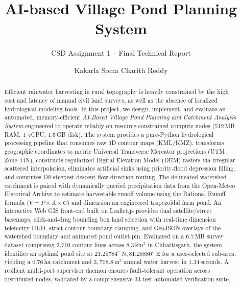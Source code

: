 \documentclass[manuscript,screen,review]{acmart}
\begin{document}
\title{AI-based Village Pond Planning System}
\subtitle{CSD Assignment 1 -- Final Technical Report}

\author{Kakarla Soma Charith Reddy}

\renewcommand{\shortauthors}{}

\begin{abstract}
Efficient rainwater harvesting in rural topography is heavily constrained by the high cost and latency of manual civil land surveys, as well as the absence of localized hydrological modeling tools. In this project, we design, implement, and evaluate an automated, memory-efficient \emph{AI-Based Village Pond Planning and Catchment Analysis System} engineered to operate reliably on resource-constrained compute nodes (512\,MB RAM, 1 vCPU, 1.5\,GB disk). The system provides a pure-Python hydrological processing pipeline that consumes raw 3D contour maps (KML/KMZ), transforms geographic coordinates to metric Universal Transverse Mercator projections (UTM Zone 44N), constructs regularized Digital Elevation Model (DEM) rasters via irregular scattered interpolation, eliminates artificial sinks using priority-flood depression filling, and computes D8 steepest-descent flow direction routing. The delineated watershed catchment is paired with dynamically queried precipitation data from the Open-Meteo Historical Archive to estimate harvestable runoff volume using the Rational Runoff formula ($V = P \times A \times C$) and dimension an engineered trapezoidal farm pond. An interactive Web GIS front-end built on Leaflet.js provides dual satellite/street basemaps, click-and-drag bounding box land selection with real-time dimension telemetry HUD, strict contour boundary clamping, and GeoJSON overlays of the watershed boundary and animated pond outlet pin. Evaluated on a 6.7\,MB survey dataset comprising 2,710 contour lines across 8.3\,km$^2$ in Chhattisgarh, the system identifies an optimal pond site at $21.25784^\circ\text{ N}, 81.28880^\circ\text{ E}$ for a user-selected sub-area, yielding a 0.76\,ha catchment and $3,708.8\,\text{m}^3$ annual water harvest in 1.34\,seconds. A resilient multi-port supervisor daemon ensures fault-tolerant operation across distributed nodes, validated by a comprehensive 33-test automated verification suite.
\end{abstract}
\end{document}

